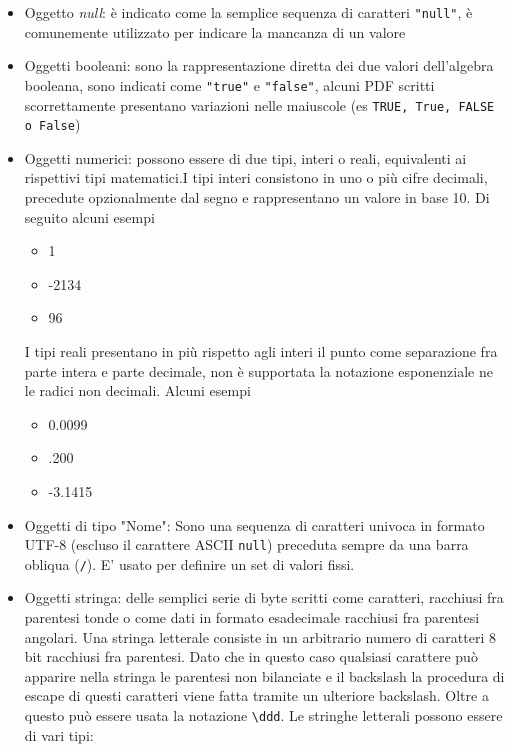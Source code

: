 \begin{itemize}
	\item Oggetto \textit{null}: è indicato come la semplice sequenza di caratteri \texttt{"null"}, è comunemente utilizzato per indicare la mancanza di un valore
	\item Oggetti booleani: sono la rappresentazione diretta dei due valori dell'algebra booleana, sono indicati come \texttt{"true"} e \texttt{"false"}, alcuni PDF scritti scorrettamente presentano variazioni nelle maiuscole (es \texttt{TRUE, True, FALSE o False})
	\item Oggetti numerici: possono essere di due tipi, interi o reali, equivalenti ai rispettivi tipi matematici.\newline I tipi interi consistono in uno o più cifre decimali, precedute opzionalmente dal segno e rappresentano un valore in base 10. Di seguito alcuni esempi
	 \begin{itemize} 
	 	\item 1 
	 	\item -2134
	 	\item 96
	 \end{itemize}
	 I tipi reali presentano in più rispetto agli interi il punto come separazione fra parte intera e parte decimale, non è supportata la notazione esponenziale ne le radici non decimali. Alcuni esempi
	 \begin{itemize}
	 \item 0.0099
	 \item .200
	 \item -3.1415
	 \end{itemize}
	 \item Oggetti di tipo "Nome": Sono una sequenza di caratteri univoca in formato UTF-8 (escluso il carattere ASCII \texttt{null}) preceduta sempre da una barra obliqua (\texttt{/}). E' usato per definire un set di valori fissi.
	 \item Oggetti stringa: delle semplici serie di byte scritti come caratteri, racchiusi fra parentesi tonde o come dati in formato esadecimale racchiusi fra parentesi angolari. Una stringa letterale consiste in un arbitrario numero di caratteri 8 bit racchiusi fra parentesi. Dato che in questo caso qualsiasi carattere può apparire nella stringa le parentesi non bilanciate e il backslash la procedura di escape di questi caratteri viene fatta tramite un ulteriore backslash. Oltre a questo può essere usata la notazione \texttt{\textbackslash ddd}. Le stringhe letterali possono essere di vari tipi:
		\begin{itemize}

\end{itemize}
\end{itemize}
